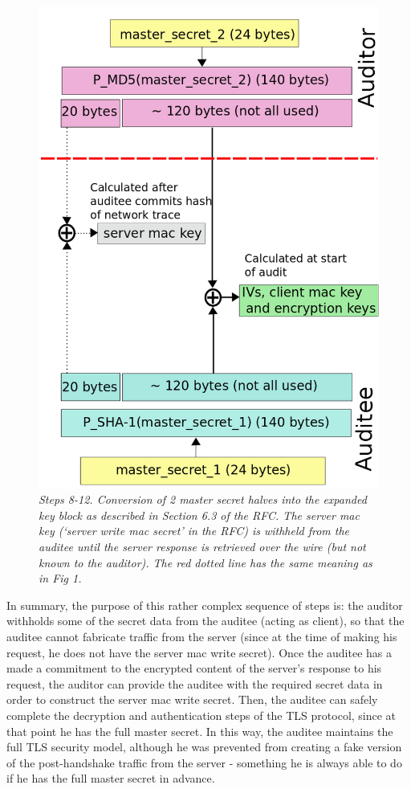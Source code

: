 \documentclass[10pt,a4paper]{article}
\begin{document}
\begin{figure}[h]
\centering
\includegraphics[scale=0.3]{MS_to_keys.png}
\caption{\emph{Steps 8-12. Conversion of 2 master secret halves into the expanded key block as described in Section 6.3 of the RFC. The server mac key (`server write mac secret' in the RFC) is withheld from the auditee until the server response is retrieved over the wire (but not known to the auditor). The red dotted line has the same meaning as in Fig 1.}}
\end{figure}

\noindent In summary, the purpose of this rather complex sequence of steps is: the auditor withholds some of the secret data from the auditee (acting as client), so that the auditee cannot fabricate traffic from the server (since at the time of making his request, he does not have the server mac write secret). Once the auditee has a made a commitment to the encrypted content of the server's response to his request, the auditor can provide the auditee with the required secret data in order to construct the server mac write secret. Then, the auditee can safely complete the decryption and authentication steps of the TLS protocol, since at that point he has the full master secret. In this way, the auditee maintains the full TLS security model, although he was prevented from creating a fake version of the post-handshake traffic from the server - something he is always able to do if he has the full master secret in advance.
\end{document}
